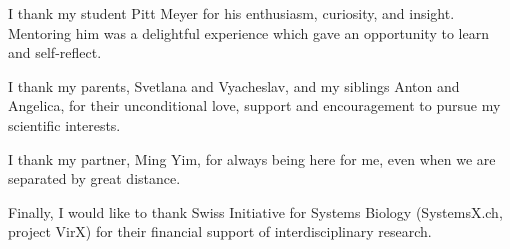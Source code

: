 I thank my student Pitt Meyer for his enthusiasm, curiosity, and insight. Mentoring him was a delightful experience which gave an opportunity to learn and self-reflect.

I thank my parents, Svetlana and Vyacheslav, and my siblings Anton and Angelica, for their unconditional love, support and encouragement to pursue my scientific interests. 

I thank my partner, Ming Yim, for always being here for me, even when we are separated by great distance.

Finally, I would like to thank Swiss Initiative for Systems Biology (SystemsX.ch, project VirX) for their financial support of interdisciplinary research.

\endgroup
